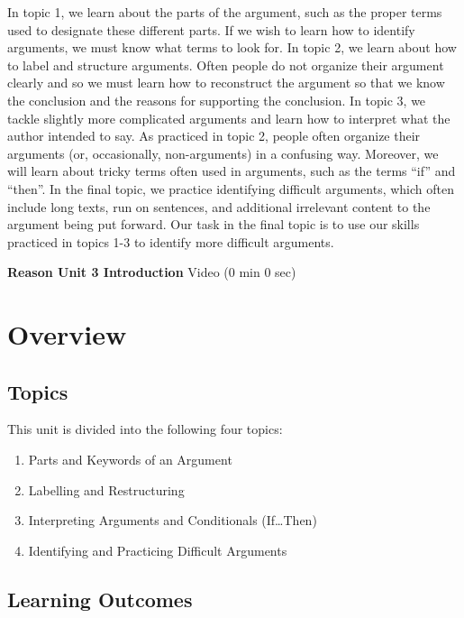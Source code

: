 \documentclass[
]{book}
\providecommand{\tightlist}{%
  \setlength{\itemsep}{0pt}\setlength{\parskip}{0pt}}
\begin{document}
In topic 1, we learn about the parts of the argument, such as the proper terms used to designate these different parts. If we wish to learn how to identify arguments, we must know what terms to look for. In topic 2, we learn about how to label and structure arguments. Often people do not organize their argument clearly and so we must learn how to reconstruct the argument so that we know the conclusion and the reasons for supporting the conclusion. In topic 3, we tackle slightly more complicated arguments and learn how to interpret what the author intended to say. As practiced in topic 2, people often organize their arguments (or, occasionally, non-arguments) in a confusing way. Moreover, we will learn about tricky terms often used in arguments, such as the terms ``if'' and ``then''. In the final topic, we practice identifying difficult arguments, which often include long texts, run on sentences, and additional irrelevant content to the argument being put forward. Our task in the final topic is to use our skills practiced in topics 1-3 to identify more difficult arguments.

\textbf{Reason Unit 3 Introduction} Video (0 min 0 sec)

\hypertarget{overview-2}{%
\section*{Overview}\label{overview-2}}

\hypertarget{topics-2}{%
\subsection*{Topics}\label{topics-2}}

This unit is divided into the following four topics:

\begin{enumerate}
\def\labelenumi{\arabic{enumi}.}
\tightlist
\item
  Parts and Keywords of an Argument
\item
  Labelling and Restructuring
\item
  Interpreting Arguments and Conditionals (If\ldots Then)
\item
  Identifying and Practicing Difficult Arguments
\end{enumerate}

\hypertarget{learning-outcomes-2}{%
\subsection*{Learning Outcomes}\label{learning-outcomes-2}}
\end{document}
